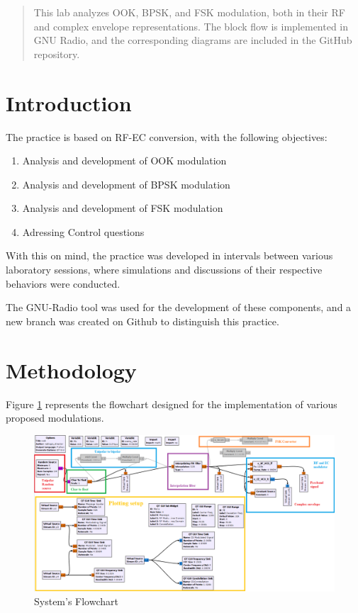 \documentclass{journal}[IEEEtran, twocolumn]             %
\begin{document}
\begin{multicols}{2}

\begin{abstract}

This lab analyzes OOK, BPSK, and FSK modulation, both in their RF and complex envelope representations. The block flow is implemented in GNU Radio, and the corresponding diagrams are included in the GitHub repository.

\end{abstract}

\section{Introduction}

The practice is based on RF-EC conversion, with the following objectives:

\begin{enumerate}
    \item Analysis and development of OOK modulation\item Analysis and development of BPSK modulation \item Analysis and development of FSK modulation\item Adressing Control questions
\end{enumerate}

With this on mind, the practice was developed in intervals between various laboratory sessions, where simulations and discussions of their respective behaviors were conducted.

The GNU-Radio tool was used for the development of these components, and a new branch was created on Github to distinguish this practice.

\section{Methodology}

Figure \ref{fig:figA} represents the flowchart designed for the implementation of various proposed modulations. 

\begin{figure}[H]
    \centering
        \centering
        \includegraphics[width=0.6\columnwidth]{figs/Structure.png}
    \caption{System's Flowchart}
    \label{fig:figA}
\end{figure}


\end{multicols}
\end{document}
